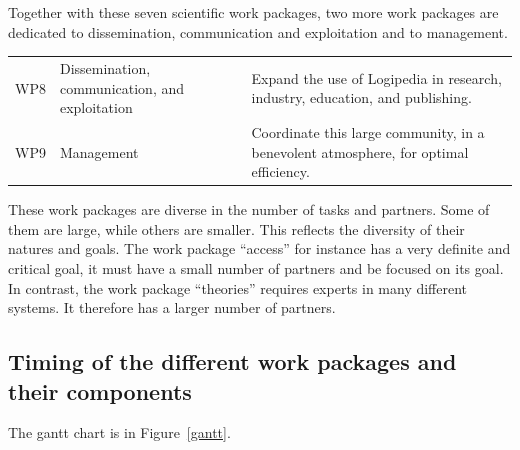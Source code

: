 Together with these seven scientific work packages, 
two more work packages are dedicated to dissemination, communication and
exploitation and to management.

\begin{longtable}{|p{}|p{}|p{}|}
\hline
\rowcolor{color2}\multicolumn{3}{|l|}{\bf Dissemination, communication, exploitation, and management:}\\
\hline
WP8
&
Dissemination, communication, and exploitation
&
Expand the use of Logipedia in research, industry, education, and publishing.
\\
\hline
WP9
&
Management
&
Coordinate this large community, in a benevolent atmosphere, for optimal
efficiency.
\\
\hline
\end{longtable}

These work packages are diverse in the number of tasks and
partners. Some of them are large, while others are smaller. This
reflects the diversity of their natures and goals. The work package
``access'' for instance has a very definite and critical goal, it must
have a small number of partners and be focused on its goal. In
contrast, the work package ``theories'' requires experts in many
different systems.  It therefore has a larger number of partners.

\wpfigstyle{\scriptsize\setlength{\tabcolsep}{2pt}}
\wpfig%

\subsection{Timing of the different work packages and their components}

The gantt chart is in Figure~\ref{gantt}.

